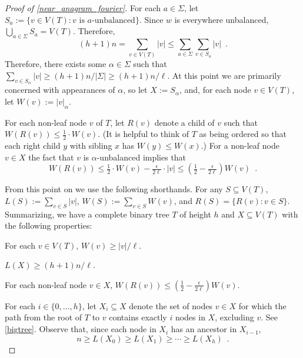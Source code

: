 \documentclass{patmorin}
\begin{document}
\begin{proof}[Proof of \cref{near_anagram_fourier}]
  For each $a\in\Sigma$, let $S_a:=\{v\in V(T): \text{$v$ is $a$-unbalanced}\}$. Since $w$ is everywhere unbalanced, $\bigcup_{a\in\Sigma} S_a=V(T)$. Therefore,
  \[
     (h+1)n = \sum_{v\in V(T)}|v|\le \sum_{a\in\Sigma} \sum_{v\in S_a} |v|
     \enspace .
  \]
  Therefore, there exists some $\alpha\in\Sigma$ such that $\sum_{v\in S_{\alpha}}|v|\ge (h+1)n/|\Sigma| \ge (h+1)n/\ell$.   At this point we are primarily concerned with appearances of $\alpha$, so let $X:=S_{\alpha}$, and, for each node $v\in V(T)$, let $W(v):=|v|_\alpha$.

  For each non-leaf node $v$ of $T$, let $R(v)$ denote a child of $v$ such that $W(R(v))\le \tfrac12\cdot W(v)$.  (It is helpful to think of $T$ as being ordered so that each right child $y$ with sibling $x$ has $W(y)\le W(x)$.)  For a non-leaf node $v\in X$ the fact that $v$ is $\alpha$-unbalanced implies that
  \[  W(R(v)) \le \tfrac{1}{2}\cdot W(v) - \tfrac{\epsilon}{2\ell}\cdot |v|
      \le (\tfrac12-\tfrac{\epsilon}{2\ell})W(v) \enspace .
  \]

  From this point on we use the following shorthands. For any $S\subseteq V(T)$, $L(S):=\sum_{v\in S}|v|$,
  $W(S):=\sum_{v\in S}W(v)$, and $R(S)=\{R(v):v\in S\}$.  Summarizing, we have a complete binary tree $T$ of height $h$ and
  $X\subseteq V(T)$ with the following properties:
  \begin{compactenum}
    \item For each $v\in V(T)$,  $W(v)\ge |v|/\ell$.
    \item $L(X) \ge (h+1)n/\ell$.
    \item For each non-leaf node $v\in X$,
      $W(R(v)) \le (\tfrac{1}{2}-\tfrac{\epsilon}{2\ell})W(v)$.
  \end{compactenum}
  For each $i\in\{0,\ldots,h\}$, let $X_i\subseteq X$ denote the
  set of nodes $v\in X$ for which the path from the root of $T$ to $v$
  contains exactly $i$ nodes in $X$, excluding $v$.  See \cref{bigtree}. Observe that, since each node in $X_i$ has an ancestor in $X_{i-1}$,
  \[  n \ge L(X_0) \ge L(X_1) \ge \cdots\ge L(X_{h}) \enspace . \]


\end{proof}
\end{document}
